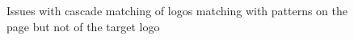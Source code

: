 \documentclass[12pt,twoside]{report}
\begin{document}
\begin{figure}[!h]
\begin{center}
      \\\\
      \\\\
    \endminipage
\end{center}
\caption{Issues with cascade matching of logos matching with patterns on the page but not of the target logo}\label{cascadecorrectissues}
\end{figure}
\restoregeometry
\clearpage
\end{document}
